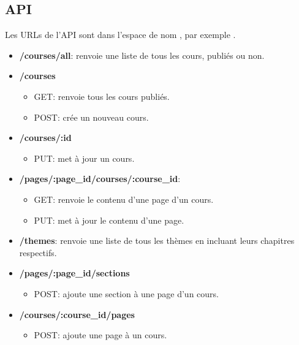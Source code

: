 \documentclass[letterpaper,10pt,oneside]{sphinxmanual}
\begin{document}
\subsection{API}
\label{guide:api}
Les URLs de l'API sont dans l'espace de nom , par exemple .
\begin{itemize}
\item {} 
\textbf{/courses/all}: renvoie une liste de tous les cours, publiés ou non.

\item {} 
\textbf{/courses}
\begin{itemize}
\item {} 
GET: renvoie tous les cours publiés.

\item {} 
POST: crée un nouveau cours.

\end{itemize}

\item {} 
\textbf{/courses/:id}
\begin{itemize}
\item {} 
PUT: met à jour un cours.

\end{itemize}

\item {} 
\textbf{/pages/:page\_id/courses/:course\_id}:
\begin{itemize}
\item {} 
GET: renvoie le contenu d'une page d'un cours.

\item {} 
PUT: met à jour le contenu d'une page.

\end{itemize}

\item {} 
\textbf{/themes}: renvoie une liste de tous les thèmes en incluant leurs chapitres respectifs.

\item {} 
\textbf{/pages/:page\_id/sections}
\begin{itemize}
\item {} 
POST: ajoute une section à une page d'un cours.

\end{itemize}

\item {} 
\textbf{/courses/:course\_id/pages}
\begin{itemize}
\item {} 
POST: ajoute une page à un cours.


\end{itemize}
\end{itemize}
\end{document}
